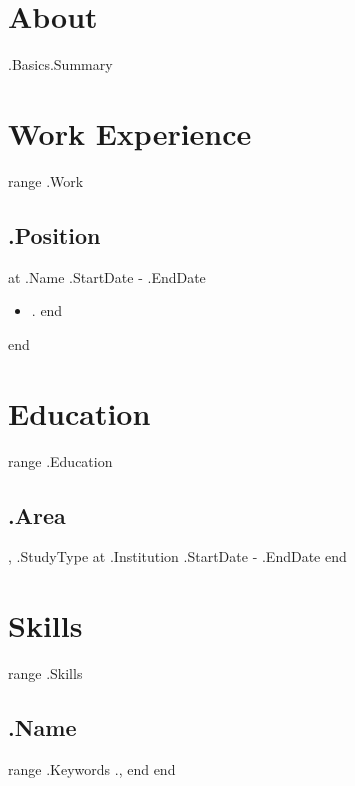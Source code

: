 \documentclass{default}
\begin{document}

    \section*{About}
    {{.Basics.Summary}}

    \section*{Work Experience}
    {{range .Work}}
        \subsection*{{.Position}} at {{.Name}}
        {{.StartDate}} - {{.EndDate}}
        \begin{itemize}
            {{range .Highlights}}
                \item {{.}}
            {{end}}
        \end{itemize}
    {{end}}

    \section*{Education}
    {{range .Education}}
        \subsection*{{.Area}}, {{.StudyType}} at {{.Institution}}
        {{.StartDate}} - {{.EndDate}}
    {{end}}

    \section*{Skills}
    {{range .Skills}}
        \subsection*{{.Name}}
        {{range .Keywords}}
            {{.}}, 
        {{end}}
    {{end}}
\end{document}

